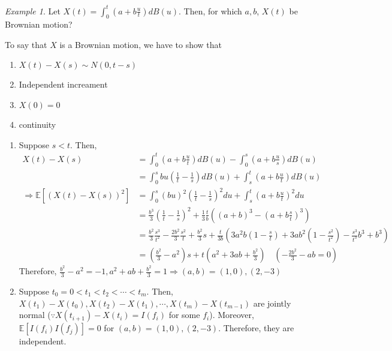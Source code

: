 \documentclass[12pt]{report}
\newcommand{\E}{\mathbb{E}}
\renewcommand{\1}{\mathbb{1}}
\theoremstyle{break}
\theoremstyle{newdef}
\theoremstyle{remark}
\newtheorem*{exmp}{Example} %
\begin{document}
\begin{exmp}
Let $X(t) = \int_0^t (a+b\frac{u}{t}) dB(u)$.
Then, for which $a,b$, $X(t)$ be Brownian motion?

To say that $X$ is a Brownian motion, we have to show that
\begin{enumerate}
\item $X(t) - X(s) \sim N(0,t-s)$
\item Independent increament
\item $X(0) = 0$
\item continuity
\end{enumerate}

\begin{enumerate}[wide]
\item Suppose $s < t$. Then,
$$
\begin{aligned}
X(t) - X(s)
&= \int_0^t (a + b\frac{u}{t}) dB(u) - \int_0^s (a+b\frac{u}{s}) dB(u)\\
&= \int_0^s bu(\frac{1}{t} - \frac{1}{s}) dB(u) + \int_s^t (a + b\frac{u}{t})dB(u)\\
\Rightarrow \E[(X(t)-X(s))^2] &= \int_0^s (bu)^2(\frac{1}{t}-\frac{1}{s})^2 du + \int_s^t (a+b\frac{u}{t})^2 du\\
&= \frac{b^3}{3}(\frac{1}{t}-\frac{1}{s})^2 + \frac{1}{3}\frac{t}{b}\left((a+b)^3 - (a+b\frac{s}{t})^3\right)\\
&= \frac{b^2}{3}\frac{s^3}{t^2} - \frac{2b^2}{3}\frac{s^2}{t} + \frac{b^2}{3}s + \frac{t}{3b}\left(3a^2b(1-\frac{s}{t}) + 3ab^2(1-\frac{s^2}{t^2}) - \frac{s^3}{t^3}b^3 + b^3\right)\\
&= (\frac{b^2}{3} - a^2)s + t(a^2 + 3ab + \frac{b^2}{3}) \quad \left(-\frac{2b^2}{3} - ab = 0\right)
\end{aligned}
$$
Therefore, $\frac{b^2}{3}-a^2 = -1, a^2 + ab + \frac{b^2}{3} = 1 \Rightarrow (a,b) = (1,0), (2,-3)$

\item Suppose $t_0 = 0 < t_1 < t_2 < \cdots < t_m$. Then,
$X(t_1) - X(t_0), X(t_2) - X(t_1), \cdots, X(t_m) - X(t_{m-1})$ are jointly normal ($\because X(t_{i+1})- X(t_i) = I(f_i)$ for some $f_i$).
Moreover, $\E[I(f_i)I(f_j)] = 0$ for $(a,b) = (1,0), (2,-3)$.
Therefore, they are independent.
\end{enumerate}
\end{exmp}

\end{document}
